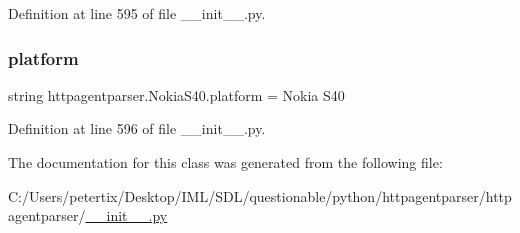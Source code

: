 Definition at line 595 of file \+\_\+\+\_\+init\+\_\+\+\_\+.\+py.

\hypertarget{classhttpagentparser_1_1_nokia_s40_ab10396e0902466c67b1888a9411819de}{}\label{classhttpagentparser_1_1_nokia_s40_ab10396e0902466c67b1888a9411819de} 
\subsubsection{\texorpdfstring{platform}{platform}}
{\footnotesize\ttfamily string httpagentparser.\+Nokia\+S40.\+platform = \textquotesingle{}Nokia S40\textquotesingle{}\hspace{0.3cm}{\ttfamily [static]}}



Definition at line 596 of file \+\_\+\+\_\+init\+\_\+\+\_\+.\+py.



The documentation for this class was generated from the following file\+:\begin{DoxyCompactItemize}
\item 
C\+:/\+Users/petertix/\+Desktop/\+I\+M\+L/\+S\+D\+L/questionable/python/httpagentparser/httpagentparser/\hyperlink{____init_____8py}{\+\_\+\+\_\+init\+\_\+\+\_\+.\+py}\end{DoxyCompactItemize}
